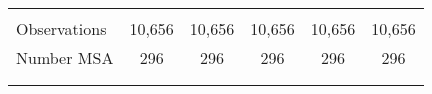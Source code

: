 \begin{tabular}{lccccc}
   
    \hline
    \vspace{-2pt} &  & & & & \\ 
    Observations & 10,656 & 10,656 & 10,656 & 10,656 & 10,656 \\
    Number MSA & 296 & 296 & 296 & 296 & 296 \\
    \hline \hline \\
    \vspace{-2pt} & \vspace{-2pt} & \vspace{-2pt} & \vspace{-2pt} \\
    \end{tabular}
